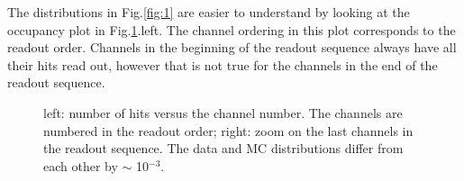 The distributions in Fig.\ref{fig:1} are easier to understand by looking at the occupancy plot in Fig.\ref{fig:2}.left.
The channel ordering in this plot corresponds to the readout order.
Channels in the beginning of the readout sequence always have all their hits read out,
  however that is not true for the channels in the end of the readout sequence.
\begin{figure}[H]
  \hspace{-0.5in}
  \caption{
    \label{fig:2}
    left: number of hits versus the channel number.
    The channels are numbered in the readout order;
    right: zoom on the last channels in the readout sequence. The data and MC distributions
    differ from each other by $\sim$ 10$^{-3}$.
  }
\end{figure}

